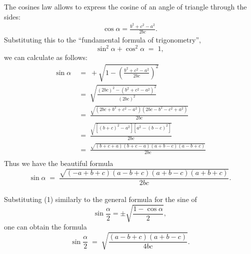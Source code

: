 \documentclass[12pt]{article}
\theoremstyle{definition}
\begin{document}
The cosines law allows to express the cosine of an angle of triangle through the sides:
\begin{align}
\cos\alpha = \frac{b^2+c^2-a^2}{2bc}.
\end{align}
Substituting this to the ``fundamental formula of trigonometry'',
$$\sin^2\alpha+\cos^2\alpha \;=\;1,$$
we can calculate as follows:
\begin{align*}
\sin\alpha & \;=\; +\sqrt{1-\left(\frac{b^2+c^2-a^2}{2bc}\right)^2}\\
& \;=\; \sqrt{\frac{(2bc)^2-(b^2+c^2-a^2)^2}{(2bc)^2}}\\
& \;=\; \frac{\sqrt{(2bc+b^2+c^2-a^2)(2bc-b^2-c^2+a^2)}}{2bc}\\
& \;=\; \frac{\sqrt{[(b+c)^2-a^2][a^2-(b-c)^2]}}{2bc}\\
& \;=\; \frac{\sqrt{(b+c+a)(b+c-a)(a+b-c)(a-b+c)}}{2bc}\\
\end{align*}
Thus we have the beautiful formula
$$\sin\alpha\;=\; \frac{\sqrt{(-a\!+\!b\!+\!c)(a\!-\!b\!+\!c)(a\!+\!b\!-\!c)(a\!+\!b\!+\!c)}}{2bc}.$$\\

Substituting (1) similarly to the general formula for the sine of 
$$\sin\frac{\alpha}{2} = \pm\sqrt{\frac{1-\cos\alpha}{2}},$$
one can obtain the formula
$$\sin\frac{\alpha}{2} \;=\; \sqrt{\frac{(a\!-\!b\!+\!c)(a\!+\!b\!-\!c)}{4bc}}.$$

\end{document}
